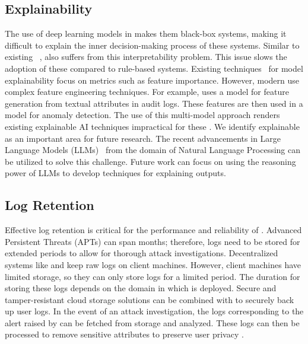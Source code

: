 \subsection{Explainability} The use of deep learning models in \pids makes them black-box systems, making it difficult to explain the inner decision-making process of these systems. Similar to existing \pids~\cite{flash2024,cheng2023kairos,yangprographer}, \Sys also suffers from this interpretability problem. This issue slows the adoption of these \pids compared to rule-based systems. Existing techniques~\cite{antwarg2021explaining,brown2018recurrent,ardito2021revisiting,hwang2021sfd} for model explainability focus on metrics such as feature importance. However, modern \pids use complex feature engineering techniques. For example, \flash uses a \wordvec model for feature generation from textual attributes in audit logs. These features are then used in a \gnn model for anomaly detection. The use of this multi-model approach renders existing explainable AI techniques impractical for these \pids. We identify explainable \pids as an important area for future research. The recent advancements in Large Language Models (LLMs)~\cite{chang2024survey} from the domain of Natural Language Processing can be utilized to solve this challenge. Future work can focus on using the reasoning power of LLMs to develop techniques for explaining \pids outputs.

\subsection{Log Retention} Effective log retention \cite{wilbert2012log} is critical for the performance and reliability of \pids. Advanced Persistent Threats (APTs) can span months; therefore, logs need to be stored for extended periods to allow for thorough attack investigations. Decentralized systems like \Sys and \disdet \cite{dong2023distdet} keep raw logs on client machines. However, client machines have limited storage, so they can only store logs for a limited period. The duration for storing these logs depends on the domain in which \Sys is deployed. Secure and tamper-resistant cloud storage solutions \cite{kumar2018secure} can be combined with \Sys to securely back up user logs. In the event of an attack investigation, the logs corresponding to the alert raised by \Sys can be fetched from storage and analyzed. These logs can then be processed to remove sensitive attributes to preserve user privacy \cite{portillo2019towards}.

